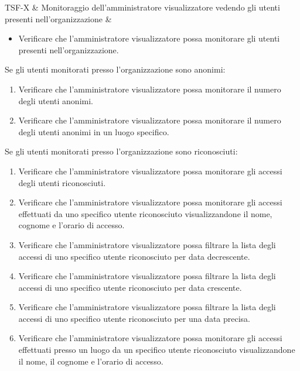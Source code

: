 TSF-X & Monitoraggio dell'amministratore visualizzatore vedendo gli utenti presenti nell'organizzazione & \begin{itemize}
    \item Verificare che l'amministratore visualizzatore possa monitorare gli utenti presenti nell'organizzazione.
\end{itemize}
Se gli utenti monitorati presso l'organizzazione sono anonimi:
\begin{enumerate}
    \item Verificare che l'amministratore visualizzatore possa monitorare il numero degli utenti anonimi.
    \item Verificare che l'amministratore visualizzatore possa monitorare il numero degli utenti anonimi in un luogo specifico.
\end{enumerate}
Se gli utenti monitorati presso l'organizzazione sono riconosciuti:
\begin{enumerate}
    \item Verificare che l'amministratore visualizzatore possa monitorare gli accessi degli utenti riconosciuti.
    \item Verificare che l'amministratore visualizzatore possa monitorare gli accessi effettuati da uno specifico utente riconosciuto visualizzandone il nome, cognome e l'orario di accesso.
    \item Verificare che l'amministratore visualizzatore possa filtrare la lista degli accessi di uno specifico utente riconosciuto per data decrescente.
    \item Verificare che l'amministratore visualizzatore possa filtrare la lista degli accessi di uno specifico utente riconosciuto per data crescente.
    \item Verificare che l'amministratore visualizzatore possa filtrare la lista degli accessi di uno specifico utente riconosciuto per una data precisa.
    \item Verificare che l'amministratore visualizzatore possa monitorare gli accessi effettuati presso un luogo da un specifico utente riconosciuto visualizzandone il nome, il cognome e l’orario di accesso.
\end{enumerate} \\



